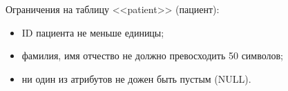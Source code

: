 Ограничения на таблицу <<patient>> (пациент):

\begin{itemize}
  \item ID пациента не меньше единицы;
  \item фамилия, имя отчество не должно превосходить 50 символов;
  \item ни один из атрибутов не дожен быть пустым (NULL).
\end{itemize}

